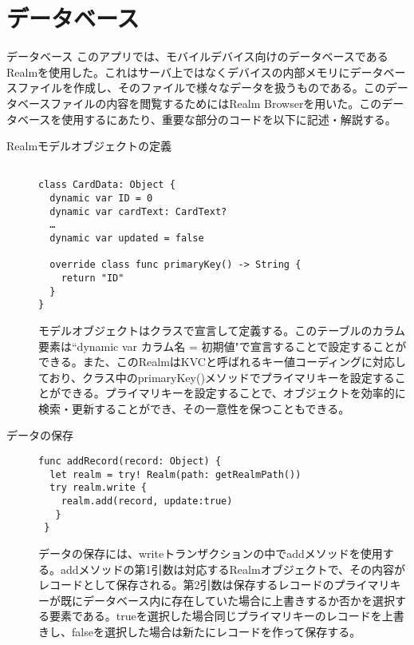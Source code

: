 \section{データベース}
データベース
このアプリでは、モバイルデバイス向けのデータベースであるRealmを使用した。これはサーバ上ではなくデバイスの内部メモリにデータベースファイルを作成し、そのファイルで様々なデータを扱うものである。このデータベースファイルの内容を閲覧するためにはRealm Browserを用いた。このデータベースを使用するにあたり、重要な部分のコードを以下に記述・解説する。
 
\begin{description}
\item[Realmモデルオブジェクトの定義]\mbox{} 
\begin{lstlisting}[basicstyle=\ttfamily\footnotesize, frame=single]
 
class CardData: Object {   
  dynamic var ID = 0
  dynamic var cardText: CardText?
  …
  dynamic var updated = false

  override class func primaryKey() -> String {
    return "ID"
  }
}
 \end{lstlisting}
 
モデルオブジェクトはクラスで宣言して定義する。このテーブルのカラム要素は``dynamic var カラム名 = 初期値"で宣言することで設定することができる。また、このRealmはKVCと呼ばれるキー値コーディングに対応しており、クラス中のprimaryKey()メソッドでプライマリキーを設定することができる。プライマリキーを設定することで、オブジェクトを効率的に検索・更新することができ、その一意性を保つこともできる。
\end{description}
 
\begin{description}
\item[データの保存]\mbox{} 
\begin{lstlisting}[basicstyle=\ttfamily\footnotesize, frame=single]
func addRecord(record: Object) {
  let realm = try! Realm(path: getRealmPath())
  try realm.write {
    realm.add(record, update:true)
   }
 }
\end{lstlisting}
 
データの保存には、writeトランザクションの中でaddメソッドを使用する。addメソッドの第1引数は対応するRealmオブジェクトで、その内容がレコードとして保存される。第2引数は保存するレコードのプライマリキーが既にデータベース内に存在していた場合に上書きするか否かを選択する要素である。trueを選択した場合同じプライマリキーのレコードを上書きし、falseを選択した場合は新たにレコードを作って保存する。
\end{description}
 
